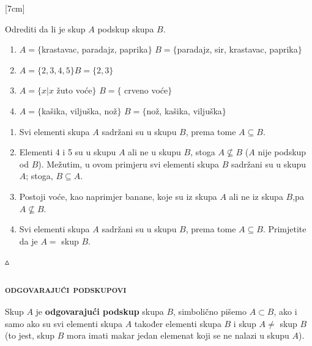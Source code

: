 \documentclass[a4paper,14pt,svgnames]{article}
\newcounter{counter}
\newcommand{\examplecounter}{\textbf{\refstepcounter{counter}PRIMJER \thecounter}}
\newcommand{\example}[3]{\begin{tcolorbox}[title=\large \examplecounter \hfill\small\textbf{"#1"}]
#2
\begin{tcolorbox}[title=\small \textbf{RJEŠENJE},colback=white]
\begin{center}
#3

\vspace{0.5em}\hfill $\vartriangle$
\end{center}
\end{tcolorbox}
\end{tcolorbox}}
\begin{document}
\reversemarginpar
\color{white}
[7cm]
\color{black}

\example{Da li je $A$ podskup?}{Odrediti da li je skup $A$ podskup skupa $B$.
\begin{enumerate}[label=\alph*),leftmargin=0.5cm]
\item $A=\{$krastavac, paradajz, paprika$\}$
$B=\{$paradajz, sir, krastavac, paprika$\}$
\item $A=\{2, 3, 4, 5\}$\quad $B=\{2, 3\}$
\item $A=\{x|x$ žuto voće$\}$
$B=\{$ crveno voće$\}$
\item $A=\{$kašika, viljuška, nož$\}$
$B=\{$nož, kašika, viljuška$\}$
\end{enumerate}}{%
{\begin{enumerate}[label=\alph*),leftmargin=0.5cm]
\item Svi elementi skupa $A$ sadržani su u skupu $B$, prema tome $A\subseteq B$.
\item Elementi 4 i 5 su u skupu $A$ ali ne u skupu $B$, stoga $A\nsubseteq B$ ($A$ nije podskup od $B$). Mežutim, u ovom primjeru svi elementi skupa $B$ sadržani su u skupu $A$; stoga, $B\subseteq A$.
\item Postoji voće, kao naprimjer banane, koje su iz skupa $A$ ali ne iz skupa $B$,pa $A\nsubseteq B$.
\item Svi elementi skupa $A$ sadržani su u skupu $B$, prema tome $A\subseteq B$. Primjetite da je $A=$ skup $B$.
\end{enumerate}}}

\newpage
\subsubsection{\textsc{odgovarajući podskupovi}}
\bigskip\bigskip
\begin{tcolorbox}
Skup $A$ je \textbf{odgovarajući podskup} skupa $B$, simbolično pišemo $A\subset B$, ako i samo ako su svi elementi skupa $A$ također elementi skupa $B$ i skup $A\neq$ skup $B$(to jest, skup $B$ mora imati makar jedan elemenat koji se ne nalazi u skupu $A$).
\end{tcolorbox}\smallskip
\end{document}
